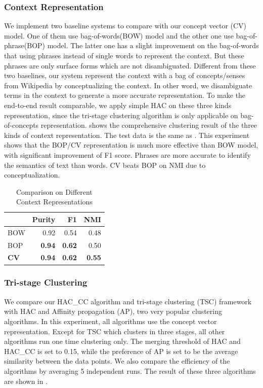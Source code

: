 \subsubsection{Context Representation}
We implement two baseline systems to compare with our concept vector (CV) model.
One of them use bag-of-words(BOW) model and the other one use bag-of-phrase(BOP) model.
The latter one has a slight improvement on the bag-of-words that using
phrases instead of single words to represent the context. But these phrases
are only surface forms which are not disambiguated. Different from these two
baselines, our system represent the context with a bag of concepts/senses from
Wikipedia by conceptualizing the context. In other word, we disambiguate terms
in the context to generate a more accurate representation.
To make the end-to-end result comparable,
we apply simple HAC on these three kinds representation,
since the tri-stage clustering algorithm is only applicable on bag-of-concepts
representation.  shows
the comprehensive clustering result of the three kinds of context representation.
The test data is the same as .
This experiment shows that the BOP/CV representation is much more effective than
BOW model, with significant improvement of F1 score. Phrases are more
accurate to identify the semantics of text than words. CV beats BOP
on NMI due to conceptualization.

\begin{table}[th]
\centering
\caption{Comparison on Different Context Representations}
\small
\begin{tabular}{|l|r|r|r|}
\hline
     &        Purity &          F1 &         NMI \\
\hline
       BOW &      0.92      &      0.54      &      0.48      \\
\hline
       BOP &    {\bf  0.94}      &     {\bf 0.62}      &      0.50      \\
\hline
     {\bf  CV} &    {\bf  0.94}      &   {\bf 0.62}   &     {\bf 0.55} \\
\hline
\end{tabular}
\label{tab:represent}
\end{table}


\subsubsection{Tri-stage Clustering}
We compare our HAC\_CC algorithm and tri-stage clustering (TSC) framework with
HAC and Affinity propagation (AP), two very popular clustering algorithms.
In this experiment, all algorithms use the concept vector representation.
Except for TSC which clusters in three stages,
all other algorithms run one time clustering only.
The merging threshold of HAC and HAC\_CC is set to 0.15, while
the preference of AP is set to be the average similarity between
the data points. We also compare the efficiency of the algorithms
by averaging 5 independent runs.
The result of these three algorithms are shown in
.

